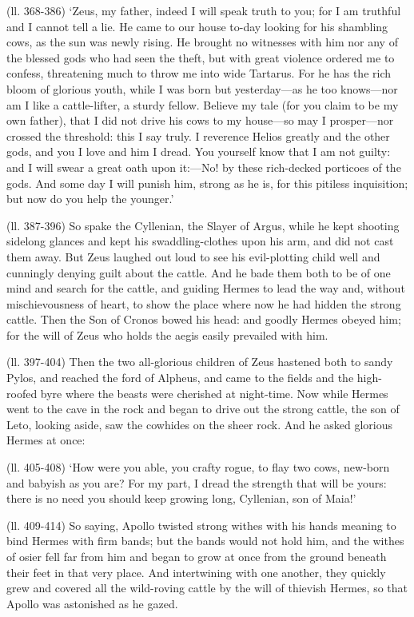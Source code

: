 (ll. 368-386) ‘Zeus, my father, indeed I will speak truth to you; for I
am truthful and I cannot tell a lie. He came to our house to-day looking for
his shambling cows, as the sun was newly rising. He brought no witnesses with
him nor any of the blessed gods who had seen the theft, but with great violence
ordered me to confess, threatening much to throw me into wide Tartarus. For he
has the rich bloom of glorious youth, while I was born but yesterday—as
he too knows—nor am I like a cattle-lifter, a sturdy fellow. Believe my
tale (for you claim to be my own father), that I did not drive his cows to my
house—so may I prosper—nor crossed the threshold: this I say truly.
I reverence Helios greatly and the other gods, and you I love and him I dread.
You yourself know that I am not guilty: and I will swear a great oath upon
it:—No! by these rich-decked porticoes of the gods. And some day I will
punish him, strong as he is, for this pitiless inquisition; but now do you help
the younger.’

(ll. 387-396) So spake the Cyllenian, the Slayer of Argus, while he kept
shooting sidelong glances and kept his swaddling-clothes upon his arm, and did
not cast them away. But Zeus laughed out loud to see his evil-plotting child
well and cunningly denying guilt about the cattle. And he bade them both to be
of one mind and search for the cattle, and guiding Hermes to lead the way and,
without mischievousness of heart, to show the place where now he had hidden the
strong cattle. Then the Son of Cronos bowed his head: and goodly Hermes obeyed
him; for the will of Zeus who holds the aegis easily prevailed with him.

(ll. 397-404) Then the two all-glorious children of Zeus hastened both to sandy
Pylos, and reached the ford of Alpheus, and came to the fields and the
high-roofed byre where the beasts were cherished at night-time. Now while
Hermes went to the cave in the rock and began to drive out the strong cattle,
the son of Leto, looking aside, saw the cowhides on the sheer rock. And he
asked glorious Hermes at once:

(ll. 405-408) ‘How were you able, you crafty rogue, to flay two cows,
new-born and babyish as you are? For my part, I dread the strength that will be
yours: there is no need you should keep growing long, Cyllenian, son of
Maia!’

(ll. 409-414) So saying, Apollo twisted strong withes with his hands meaning to
bind Hermes with firm bands; but the bands would not hold him, and the withes
of osier fell far from him and began to grow at once from the ground beneath
their feet in that very place. And intertwining with one another, they quickly
grew and covered all the wild-roving cattle by the will of thievish Hermes, so
that Apollo was astonished as he gazed.

